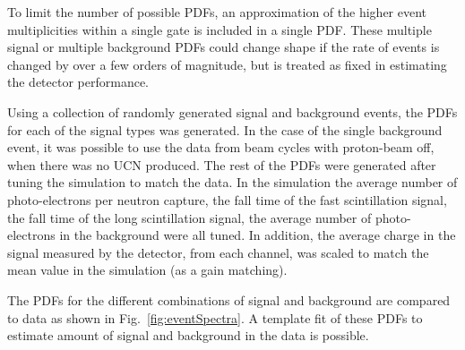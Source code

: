 \documentclass[review]{elsarticle}
\begin{document}
To limit the number of possible PDFs, an approximation of the higher
event multiplicities within a single gate is included in a single PDF.
These multiple signal or multiple background PDFs could change shape
if the rate of events is changed by over a few orders of magnitude,
but is treated as fixed in estimating the detector performance.

Using a collection of randomly generated signal and background events,
the PDFs for each of the signal types was generated.  In the case of
the single background event, it was possible to use the data from beam
cycles with proton-beam off, when there was no UCN produced.  The rest
of the PDFs were generated after tuning the simulation to match the
data.  In the simulation the average number of photo-electrons per
neutron capture, the fall time of the fast scintillation signal, the
fall time of the long scintillation signal, the average number of
photo-electrons in the background were all tuned.  In addition, the
average charge in the signal measured by the detector, from each
channel, was scaled to match the mean value in the simulation (as a
gain matching).

The PDFs for the different combinations of signal and background are
compared to data as shown in Fig.~\ref{fig:eventSpectra}.  A template
fit of these PDFs to estimate amount of signal and background in the
data is possible.
\end{document}
